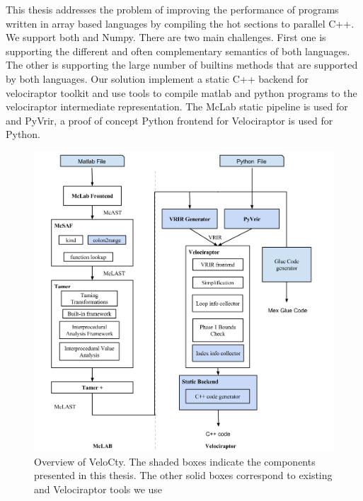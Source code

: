 This thesis addresses the problem of improving the performance of programs written in array based languages by compiling the hot sections to parallel C++. We support both \matlab and Numpy. There are two main challenges. First one is supporting the different and often complementary semantics of both languages. The other is supporting the large number of builtins methods that are supported by both languages.
Our solution implement a static C++ backend for velociraptor toolkit and use tools to compile matlab and python programs to the velociraptor intermediate representation. The McLab static pipeline is used for \matlab and PyVrir, a proof of concept Python frontend for Velociraptor is used for Python. 

\begin{figure}[htbp]
\begin{center}
\includegraphics[scale=0.5]{Figures/Overview_thesis.png}
\caption[Overview of the VeloCty]{Overview
of VeloCty.  The shaded boxes indicate the components
presented in this thesis.  The other solid boxes correspond to
existing \mclab and Velociraptor tools we use}\label{Fig:Overview}
\end{center}
\end{figure}
